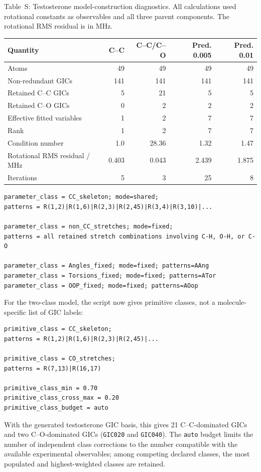 \documentclass[12pt]{article}
\renewcommand{\thetable}{S\arabic{table}}
\begin{document}
\begin{center}
\label{tab:si-testosterone-diagnostics}
\parbox{0.94\linewidth}{\small Table~\thetable: Testosterone
model-construction diagnostics. All calculations used rotational constants as
observables and all three parent components. The rotational RMS residual is in
MHz.}

\smallskip
\begin{tabular}{lrrrr}
\toprule
Quantity & C--C & C--C/C--O & Pred. 0.005 & Pred. 0.01 \\
\midrule
Atoms & 49 & 49 & 49 & 49 \\
Non-redundant GICs & 141 & 141 & 141 & 141 \\
Retained C--C GICs & 5 & 21 & 5 & 5 \\
Retained C--O GICs & 0 & 2 & 2 & 2 \\
Effective fitted variables & 1 & 2 & 7 & 7 \\
Rank & 1 & 2 & 7 & 7 \\
Condition number & 1.0 & 28.36 & 1.32 & 1.47 \\
Rotational RMS residual / MHz & 0.403 & 0.043 & 2.439 & 1.875 \\
Iterations & 5 & 3 & 25 & 8 \\
\bottomrule
\end{tabular}
\end{center}

\begin{lstlisting}
parameter_class = CC_skeleton; mode=shared;
patterns = R(1,2)|R(1,6)|R(2,3)|R(2,45)|R(3,4)|R(3,10)|...

parameter_class = non_CC_stretches; mode=fixed;
patterns = all retained stretch combinations involving C-H, O-H, or C-O

parameter_class = Angles_fixed; mode=fixed; patterns=AAng
parameter_class = Torsions_fixed; mode=fixed; patterns=ATor
parameter_class = OOP_fixed; mode=fixed; patterns=AOop
\end{lstlisting}

For the two-class model, the script now gives primitive classes, not a
molecule-specific list of GIC labels:
\begin{lstlisting}
primitive_class = CC_skeleton;
patterns = R(1,2)|R(1,6)|R(2,3)|R(2,45)|...

primitive_class = CO_stretches;
patterns = R(7,13)|R(16,17)

primitive_class_min = 0.70
primitive_class_cross_max = 0.20
primitive_class_budget = auto
\end{lstlisting}
With the generated testosterone GIC basis, this gives 21 C--C-dominated GICs
and two C--O-dominated GICs (\texttt{GIC020} and \texttt{GIC040}). The
\texttt{auto} budget limits the number of independent class corrections to the
number compatible with the available experimental observables; among competing
declared classes, the most populated and highest-weighted classes are retained.
\end{document}
